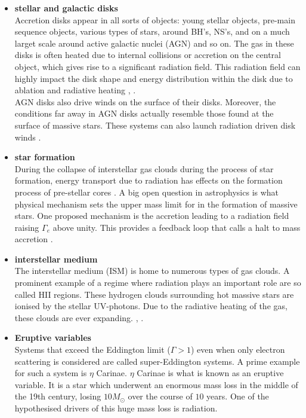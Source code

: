 \begin{itemize}
\item \textbf{stellar and galactic disks}\\
Accretion disks appear in all sorts of objects: young stellar objects, pre-main sequence objects, various types of stars, around BH's, NS's,  and on a much larget scale around active galactic nuclei (AGN) \citep{Proga2009} and so on. The gas in these disks is often heated due to internal collisions or accretion on the central object, which gives rise to a significant radiation field. This radiation field can highly impact the disk shape and energy distribution within the disk due to ablation and radiative heating \citep{Kee2018}, \citep{Nakatani2017}. \\
AGN disks also drive winds on the surface of their disks. Moreover, the conditions far away in AGN disks actually resemble those found at the surface of massive stars. These systems can also launch radiation driven disk winds \citep{Proga2009}.

\item \textbf{star formation}\\
During the collapse of interstellar gas clouds during the process of star formation, energy transport due to radiation has effects on the formation process of pre-stellar cores \citep{Bhandare2017}. A big open question in astrophysics is what physical mechanism sets the upper mass limit for in the formation of massive stars. One proposed mechanism is the accretion leading to a radiation field raising $\Gamma_e$ above unity. This provides a feedback loop that calls a halt to mass accretion \cite{Vink2018}.


\item \textbf{interstellar medium}\\
The interstellar medium (ISM) is home to numerous types of gas clouds. A prominent example of a regime where radiation plays an important role are so called HII regions. These hydrogen clouds surrounding hot massive stars are ionised by the stellar UV-photons. Due to the radiative heating of the gas, these clouds are ever expanding. \citep{ISM course notes}, \citep{Klaassen2017}. 

\item \textbf{Eruptive variables}\\
Systems that exceed the Eddington limit ($\Gamma > 1$) even when only electron scattering is considered are called super-Eddington systems. A prime example for such a system is $\eta$ Carinae. $\eta$ Carinae is what is known as an eruptive variable. It is a star which underwent an enormous mass loss in the middle of the 19th century, losing $10 M_\odot$ over the course of $10$ years. One of the hypothesised drivers of this huge mass loss is radiation\citep{Smith2003}.
\end{itemize}

